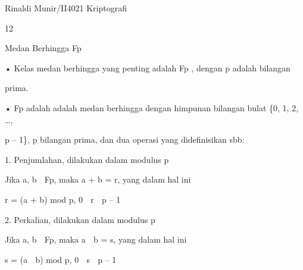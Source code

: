 \documentclass{article}
\begin{document}

Rinaldi Munir/II4021 Kriptografi

12

Medan Berhingga Fp

• Kelas medan berhingga yang penting adalah Fp ,  dengan p adalah bilangan 

prima.

• Fp adalah adalah medan berhingga dengan himpunan bilangan bulat \{0, 1, 2, …, 

p – 1\}, p bilangan prima, dan dua operasi yang didefinisikan sbb:

 1. Penjumlahan, dilakukan dalam modulus p


Jika a, b  Fp, maka a + b = r, yang dalam hal ini


r = (a + b) mod p,  0  r  p – 1

 2. Perkalian, dilakukan dalam modulus p


Jika a, b  Fp, maka a  b = s, yang dalam hal ini


s = (a  b) mod p,   0  s  p – 1
\end{document}
